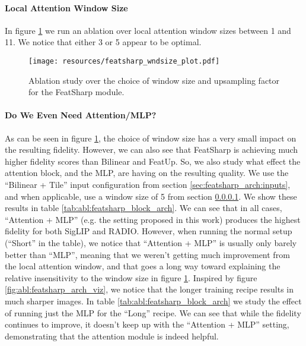 \paragraph{Local Attention Window Size}\label{sec:featsharp_arch:window_size}

In figure \ref{fig:abl:window_size} we run an ablation over local attention window sizes between 1 and 11. We notice that either 3 or 5 appear to be optimal.

\begin{figure}[t]
    \centering
    \texttt{[image: resources/featsharp\_wndsize\_plot.pdf]}
    \vspace{-7mm}
    \caption{Ablation study over the choice of window size and upsampling factor for the FeatSharp module.}
    \label{fig:abl:window_size}
\end{figure}

\paragraph{Do We Even Need Attention/MLP?}

As can be seen in figure \ref{fig:abl:window_size}, the choice of window size has a very small impact on the resulting fidelity. However, we can also see that FeatSharp is achieving much higher fidelity scores than Bilinear and FeatUp. So, we also study what effect the attention block, and the MLP, are having on the resulting quality. We use the ``Bilinear + Tile'' input configuration from section \ref{sec:featsharp_arch:inputs}, and when applicable, use a window size of 5 from section \ref{sec:featsharp_arch:window_size}. We show these results in table \ref{tab:abl:featsharp_block_arch}. We can see that in all cases, ``Attention + MLP'' (e.g. the setting proposed in this work) produces the highest fidelity for both SigLIP and RADIO. However, when running the normal setup (``Short'' in the table), we notice that ``Attention + MLP'' is usually only barely better than ``MLP'', meaning that we weren't getting much improvement from the local attention window, and that goes a long way toward explaining the relative insensitivity to the window size in figure \ref{fig:abl:window_size}. Inspired by figure \ref{fig:abl:featsharp_arch_viz}, we notice that the longer training recipe results in much sharper images. In table \ref{tab:abl:featsharp_block_arch} we study the effect of running just the MLP for the ``Long'' recipe. We can see that while the fidelity continues to improve, it doesn't keep up with the ``Attention + MLP'' setting, demonstrating that the attention module is indeed helpful.

